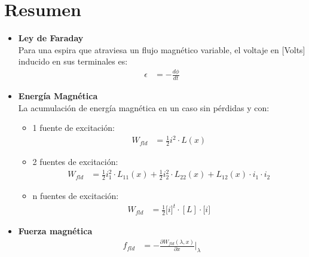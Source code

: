 \documentclass[
  11pt,
  letterpaper,
   addpoints,
   answers
  ]{exam}
\begin{document}
\section{Resumen}

\begin{itemize}
    \item \textbf{Ley de Faraday} \\
    Para una espira que atraviesa un flujo magnético variable, el voltaje en [Volts] inducido en sus terminales es:
    \begin{align}
    \epsilon &= -\frac{d\phi}{dt}
    \end{align}
    
    \item \textbf{Energía Magnética} \\
    La acumulación de energía magnética en un caso sin pérdidas y con:
    \begin{itemize}
        \item 1 fuente de excitación:
        \begin{align}
        W_{fld} &= \frac{1}{2} i^2 \cdot L(x)
        \end{align}

        \item 2 fuentes de excitación:
        \begin{align}
        W_{fld} &= \frac{1}{2} i_1^2 \cdot L_{11}(x) + \frac{1}{2} i_2^2 \cdot L_{22}(x) + L_{12}(x) \cdot i_1 \cdot i_2
        \end{align}

        \item n fuentes de excitación:
        \begin{align}
        W_{fld} &= \frac{1}{2} \mathbf[{i}]^t \cdot [L] \cdot \mathbf[{i}]
        \end{align}
    \end{itemize}

    \item \textbf{Fuerza magnética} \\
    \begin{align}
    f_{fld} &= -\frac{\partial W_{fld}(\lambda,x)}{\partial x} \Bigg|_{\lambda}
    \end{align}

\end{itemize}
\end{document}
